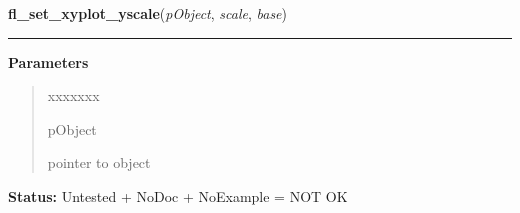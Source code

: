     \label{xformslib:library:fl_set_xyplot_yscale}

    \vspace{0.5ex}

\hspace{.8\funcindent}\begin{boxedminipage}{\funcwidth}

    \raggedright \textbf{fl\_set\_xyplot\_yscale}(\textit{pObject}, \textit{scale}, \textit{base})

    \vspace{-1.5ex}

    \rule{\textwidth}{0.5\fboxrule}
\setlength{\parskip}{2ex}
\setlength{\parskip}{1ex}
      \textbf{Parameters}
      \vspace{-1ex}

      \begin{quote}
        \begin{Ventry}{xxxxxxx}

          \item[pObject]

          pointer to object

        \end{Ventry}

      \end{quote}

\textbf{Status:} Untested + NoDoc + NoExample = NOT OK



    \end{boxedminipage}

    \label{xformslib:library:fl_clear_xyplot}

    \vspace{0.5ex}

